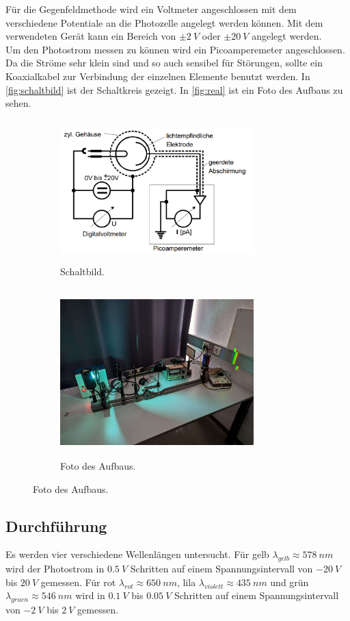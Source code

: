 Für die Gegenfeldmethode wird ein Voltmeter angeschlossen mit dem verschiedene Potentiale an die Photozelle angelegt werden können. Mit dem verwendeten Gerät kann ein Bereich von
$\pm \SI{2}{V}$ oder $\pm \SI{20}{V}$ angelegt werden.\\
Um den Photostrom messen zu können wird ein Picoamperemeter angeschlossen. Da die Ströme sehr klein sind und so auch sensibel für Störungen, sollte ein Koaxialkabel zur Verbindung
der einzelnen Elemente benutzt werden. In \autoref{fig:schaltbild} ist der Schaltkreis gezeigt. In \autoref{fig:real} ist ein Foto des Aufbaus zu sehen.
\begin{figure}[H]
    \centering
    \begin{subfigure}[b]{0.49\textwidth}
        \centering
        \includegraphics[width=7.5cm, height=5.5cm]{img/schaltbild.png}
        \caption[]
        {{\small Schaltbild.}}    
        \label{fig:schaltbild}
    \end{subfigure}
    \hfill
    \begin{subfigure}[b]{0.49\textwidth}  
        \centering 
        \includegraphics[width=7.5cm, height=6.5cm]{img/aufbau_real.jpg}
        \caption[]
        {{\small Foto des Aufbaus.}}    
        \label{fig:real}
    \end{subfigure}
\end{figure}

\subsection{Durchführung}
Es werden vier verschiedene Wellenlängen untersucht. Für gelb $\lambda_{gelb} \approx \SI{578}{nm}$ wird der Photostrom in $\SI{0.5}{V}$ Schritten auf einem Spannungsintervall
von $\SI{-20}{V}$ bis $\SI{20}{V}$ gemessen. Für rot $\lambda_{rot} \approx \SI{650}{nm}$, lila $\lambda_{violett} \approx \SI{435}{nm}$ und grün $\lambda_{gruen} \approx \SI{546}{nm}$
wird in $\SI{0.1}{V}$ bis $\SI{0.05}{V}$ Schritten auf einem Spannungsintervall von $\SI{-2}{V}$ bis $\SI{2}{V}$ gemessen.